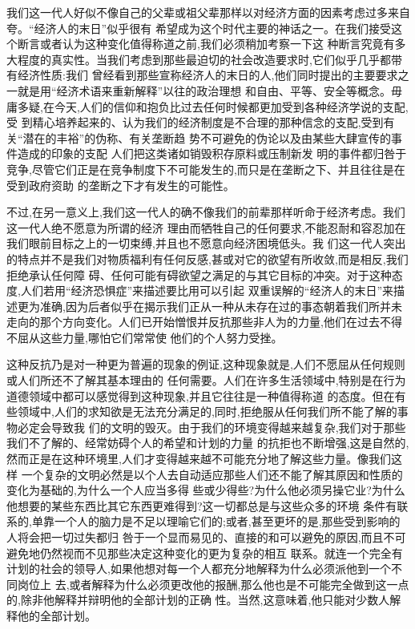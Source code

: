﻿\documentclass[12pt]{article}
\begin{document}
我们这一代人好似不像自己的父辈或祖父辈那样以对经济方面的因素考虑过多来自夸。``经济人的末日''似乎很有
希望成为这个时代主要的神话之一。在我们接受这个断言或者认为这种变化值得称道之前,我们必须稍加考察一下这
种断言究竟有多大程度的真实性。当我们考虑到那些最迫切的社会改造要求时,它们似乎几乎都带有经济性质:我们
曾经看到那些宣称经济人的末日的人,他们同时提出的主要要求之一就是用``经济术语来重新解释''以往的政治理想
和自由、平等、安全等概念。毋庸多疑,在今天,人们的信仰和抱负比过去任何时候都更加受到各种经济学说的支配,受
到精心培养起来的、认为我们的经济制度是不合理的那种信念的支配,受到有关``潜在的丰裕''的伪称、有关垄断趋
势不可避免的伪论以及由某些大肆宣传的事件造成的印象的支配 \myrule 人们把这类诸如销毁积存原料或压制新发
明的事件都归咎于竞争,尽管它们正是在竞争制度下不可能发生的,而只是在垄断之下、并且往往是在受到政府资助
的垄断之下才有发生的可能性。

不过,在另一意义上,我们这一代人的确不像我们的前辈那样听命于经济考虑。我们这一代人绝不愿意为所谓的经济
理由而牺牲自己的任何要求,不能忍耐和容忍加在我们眼前目标之上的一切束缚,并且也不愿意向经济困境低头。我
们这一代人突出的特点并不是我们对物质福利有任何反感,甚或对它的欲望有所收敛,而是相反,我们拒绝承认任何障
碍、任何可能有碍欲望之满足的与其它目标的冲突。对于这种态度,人们若用``经济恐惧症''来描述要比用可以引起
双重误解的``经济人的末日''来描述更为准确,因为后者似乎在揭示我们正从一种从未存在过的事态朝着我们所并未
走向的那个方向变化。人们已开始憎恨并反抗那些非人为的力量,他们在过去不得不屈从这些力量,哪怕它们常常使
他们的个人努力受挫。

这种反抗乃是对一种更为普遍的现象的例证,这种现象就是,人们不愿屈从任何规则或人们所还不了解其基本理由的
任何需要。人们在许多生活领域中,特别是在行为道德领域中都可以感觉得到这种现象,并且它往往是一种值得称道
的态度。但在有些领域中,人们的求知欲是无法充分满足的,同时,拒绝服从任何我们所不能了解的事物必定会导致我
们的文明的毁灭。由于我们的环境变得越来越复杂,我们对于那些我们不了解的、经常妨碍个人的希望和计划的力量
的抗拒也不断增强,这是自然的,然而正是在这种环境里,人们才变得越来越不可能充分地了解这些力量。像我们这样
一个复杂的文明必然是以个人去自动适应那些人们还不能了解其原因和性质的变化为基础的,为什么一个人应当多得
些或少得些?为什么他必须另操它业?为什么他想要的某些东西比其它东西更难得到?这一切都总是与这些众多的环境
条件有联系的,单靠一个人的脑力是不足以理喻它们的;或者,甚至更坏的是,那些受到影响的人将会把一切过失都归
咎于一个显而易见的、直接的和可以避免的原因,而且不可避免地仍然视而不见那些决定这种变化的更为复杂的相互
联系。就连一个完全有计划的社会的领导人,如果他想对每一个人都充分地解释为什么必须派他到一个不同岗位上
去,或者解释为什么必须更改他的报酬,那么他也是不可能完全做到这一点的,除非他解释并辩明他的全部计划的正确
性。当然,这意味着,他只能对少数人解释他的全部计划。
\end{document}
